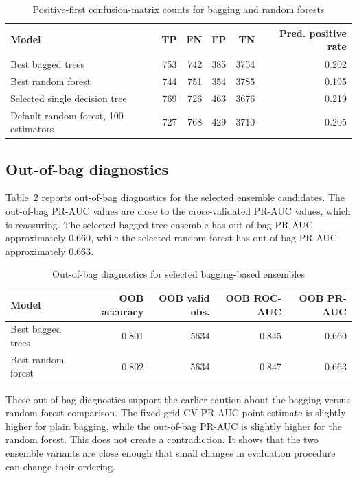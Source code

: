 \begin{table}[H]
\centering
\small
\begin{tabular}{lrrrrr}
\toprule
Model & TP & FN & FP & TN & Pred. positive rate \\
\midrule
Best bagged trees & 753 & 742 & 385 & 3754 & 0.202 \\
Best random forest & 744 & 751 & 354 & 3785 & 0.195 \\
Selected single decision tree & 769 & 726 & 463 & 3676 & 0.219 \\
Default random forest, 100 estimators & 727 & 768 & 429 & 3710 & 0.205 \\
\bottomrule
\end{tabular}
\caption{Positive-first confusion-matrix counts for bagging and random forests}
\label{tab:bagging-random-forest-confusion}
\end{table}

\subsection{Out-of-bag diagnostics}

Table~\ref{tab:bagging-random-forest-oob} reports out-of-bag diagnostics for the selected ensemble candidates. The out-of-bag PR-AUC values are close to the cross-validated PR-AUC values, which is reassuring. The selected bagged-tree ensemble has out-of-bag PR-AUC approximately \(0.660\), while the selected random forest has out-of-bag PR-AUC approximately \(0.663\).

\begin{table}[H]
\centering
\small
\begin{tabular}{lrrrr}
\toprule
Model & OOB accuracy & OOB valid obs. & OOB ROC-AUC & OOB PR-AUC \\
\midrule
Best bagged trees & 0.801 & 5634 & 0.845 & 0.660 \\
Best random forest & 0.802 & 5634 & 0.847 & 0.663 \\
\bottomrule
\end{tabular}
\caption{Out-of-bag diagnostics for selected bagging-based ensembles}
\label{tab:bagging-random-forest-oob}
\end{table}

These out-of-bag diagnostics support the earlier caution about the bagging versus random-forest comparison. The fixed-grid CV PR-AUC point estimate is slightly higher for plain bagging, while the out-of-bag PR-AUC is slightly higher for the random forest. This does not create a contradiction. It shows that the two ensemble variants are close enough that small changes in evaluation procedure can change their ordering.


